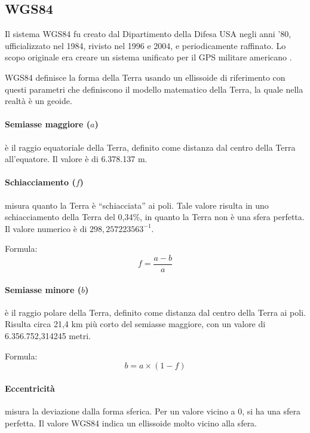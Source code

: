 \subsection{WGS84}

Il sistema WGS84 fu creato dal Dipartimento della Difesa USA negli anni '80, ufficializzato nel 1984, rivisto nel 1996 e 2004, e periodicamente raffinato. Lo scopo originale era creare un sistema unificato per il GPS militare americano \cite{wgs84updates}.

WGS84 definisce la forma della Terra usando un ellissoide di riferimento con questi parametri che definiscono il modello matematico della Terra, la quale nella realtà è un geoide.

\paragraph{Semiasse maggiore ($a$)} è il raggio equatoriale della Terra, definito come distanza dal centro della Terra all'equatore. Il valore è di 6.378.137 m.

\paragraph{Schiacciamento ($f$)} misura quanto la Terra è ``schiacciata'' ai poli. Tale valore risulta in uno schiacciamento della Terra del 0,34\%, in quanto la Terra non è una sfera perfetta. Il valore numerico è di ${298{,}257223563}^{-1}$.

Formula: 
\begin{equation}
f = \frac{a - b}{a}
\end{equation}

\paragraph{Semiasse minore ($b$)} è il raggio polare della Terra, definito come distanza dal centro della Terra ai poli. Risulta circa 21,4 km più corto del semiasse maggiore, con un valore di 6.356.752,314245 metri.

Formula: 
\begin{equation}
b = a \times (1 - f)
\end{equation}

\paragraph{Eccentricità} misura la deviazione dalla forma sferica. Per un valore vicino a 0, si ha una sfera perfetta. Il valore WGS84 indica un ellissoide molto vicino alla sfera.


